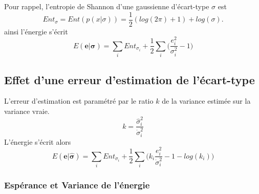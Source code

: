 \documentclass[../main/These_Mathias_Paget.tex]{subfiles}
\begin{document}
Pour rappel, l'entropie de Shannon d'une gaussienne d'écart-type $\sigma$ est
\begin{equation}
Ent_\sigma = Ent( p(x|\sigma) ) = \frac{1}{2}(log(2\pi)+1) + log(\sigma).
\end{equation}
ainsi l’énergie s’écrit
\begin{equation}
E(\boldsymbol{e}|\boldsymbol{\sigma}) = \sum_i{Ent_{\sigma_i}}  + \frac{1}{2}  \sum_i \Big( \frac{e_i^2}{\sigma_i^2} - 1 \Big)
\end{equation}

\subsection{Effet d'une erreur d'estimation de l'écart-type}
L'erreur d'estimation est paramétré par le ratio $k$ de la variance estimée sur la variance vraie.
\begin{equation}
k = \frac{\hat{\sigma}_i^2}{\dot{\sigma}_i^2}
\end{equation}
L’énergie s'écrit alors 
\begin{equation}
E(\boldsymbol{e}|\boldsymbol{\hat{\sigma}}) = \sum_i{Ent_{\dot{\sigma}_i}}  + \frac{1}{2}  \sum_i \Big( k_i \frac{e_i^2}{\dot{\sigma}_i^2} - 1 -log(k_i)\Big)
\end{equation}

\subsubsection{Espérance et Variance  de l’énergie}
\end{document}
